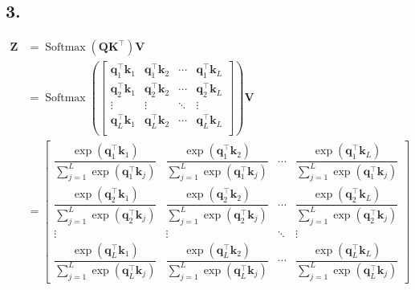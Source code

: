 \documentclass[11pt]{article}
\DeclareMathOperator{\softmax}{Softmax}
\begin{document}
\subsection{3.}
\begin{align*}
  \bm{Z} &= \softmax \left( \bm{Q} \bm{K}^{\top} \right) \bm{V} \\
         &= \softmax \left( \begin{bmatrix}
                              \bm{q}_{1}^{\top} \bm{k}_{1} &\bm{q}_{1}^{\top} \bm{k}_{2} &\cdots &\bm{q}_{1}^{\top} \bm{k}_{L} \\
                              \bm{q}_{2}^{\top} \bm{k}_{1} &\bm{q}_{2}^{\top} \bm{k}_{2} &\cdots &\bm{q}_{2}^{\top} \bm{k}_{L} \\
                              \vdots &\vdots &\ddots &\vdots \\
                              \bm{q}_{L}^{\top} \bm{k}_{1} &\bm{q}_{L}^{\top} \bm{k}_{2} &\cdots &\bm{q}_{L}^{\top} \bm{k}_{L} \\
                            \end{bmatrix} \right) \bm{V} \\
         &= \begin{bmatrix}
                              \dfrac{\exp \left( \bm{q}_{1}^{\top} \bm{k}_{1} \right)}{\sum_{j = 1}^{L} \exp \left( \bm{q}_{1}^{\top} \bm{k}_{j} \right)} &\dfrac{\exp \left( \bm{q}_{1}^{\top} \bm{k}_{2} \right)}{\sum_{j = 1}^{L} \exp \left( \bm{q}_{1}^{\top} \bm{k}_{j} \right)} &\cdots &\dfrac{\exp \left( \bm{q}_{1}^{\top} \bm{k}_{L} \right)}{\sum_{j = 1}^{L} \exp \left( \bm{q}_{1}^{\top} \bm{k}_{j} \right)} \\
              \dfrac{\exp \left( \bm{q}_{2}^{\top} \bm{k}_{1} \right)}{\sum_{j = 1}^{L} \exp \left( \bm{q}_{2}^{\top} \bm{k}_{j} \right)} &\dfrac{\exp \left( \bm{q}_{2}^{\top} \bm{k}_{2} \right)}{\sum_{j = 1}^{L} \exp \left( \bm{q}_{2}^{\top} \bm{k}_{j} \right)} &\cdots &\dfrac{\exp \left( \bm{q}_{2}^{\top} \bm{k}_{L} \right)}{\sum_{j = 1}^{L} \exp \left( \bm{q}_{2}^{\top} \bm{k}_{j} \right)} \\
                              \vdots &\vdots &\ddots &\vdots \\
              \dfrac{\exp \left( \bm{q}_{L}^{\top} \bm{k}_{1} \right)}{\sum_{j = 1}^{L} \exp \left( \bm{q}_{L}^{\top} \bm{k}_{j} \right)} &\dfrac{\exp \left( \bm{q}_{L}^{\top} \bm{k}_{2} \right)}{\sum_{j = 1}^{L} \exp \left( \bm{q}_{L}^{\top} \bm{k}_{j} \right)} &\cdots &\dfrac{\exp \left( \bm{q}_{L}^{\top} \bm{k}_{L} \right)}{\sum_{j = 1}^{L} \exp \left( \bm{q}_{L}^{\top} \bm{k}_{j} \right)}

\end{bmatrix}
\end{align*}
\end{document}
